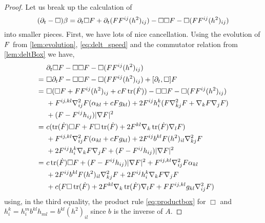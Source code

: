 \documentclass{amsart}
\begin{document}
\begin{proof}
Let us break up the calculation of
\[
(\partial_{t} - \Box)\beta =  \partial_{t}\Box F + \partial_{t} (FF^{ij} (h^2)_{ij}) - \Box\Box F - \Box(FF^{ij} (h^2)_{ij})
\]
into smaller pieces. First, we have lots of nice cancellation. Using the evolution of \(F\) from \cref{lem:evolution}, \cref{eq:delt_speed} and the commutator relation from \cref{lem:deltBox} we have,
\begin{equation}
\label{eq:deltbeta1}
\begin{split}
&\partial_{t}\Box\p - \Box\Box\p - \Box(\p\p^{ij} (h^2)_{ij})\\ =\ &\Box\partial_t\p - \Box\Box\p - \Box(\p\p^{ij} (h^2)_{ij}) + [\partial_t, \Box] \p \\
=\ &\Box(\Box \p + \p\p^{ij}(h^2)_{ij} + c \p\operatorname{tr}(\dot{\p})) - \Box\Box\p - \Box(\p\p^{ij} (h^2)_{ij})\\
\quad &+ \p^{ij,kl} \nabla^2_{ij} \p (\a_{kl} + c \p g_{kl}) + 2\p^{ij}h^{k}_{i} (\p \nabla^2_{kj} \p + \nabla_k \p \nabla_j \p)\\
\quad &+ (\p - \p^{ij}h_{ij})| \nabla\p|^{2} \\
=\ &c (\operatorname{tr}(\dot{\p}) \Box \p + \p \Box \operatorname{tr}(\dot{\p}) + 2 \p^{kl} \nabla_k \operatorname{tr}(\dot{\p}) \nabla_l \p) \\
\quad &+ \p^{ij,kl} \nabla^2_{ij} \p (\a_{kl} + c \p g_{kl}) + 2\p^{ij}b^{kl} \p (h^2)_{il} \nabla^2_{kj} \p\\
\quad  &+ 2\p^{ij}h^{k}_{i} \nabla_k \p \nabla_j \p + (\p - \p^{ij}h_{ij})| \nabla\p|^{2} \\
=\ &c \operatorname{tr}(\dot{\p}) \Box \p + (\p - \p^{ij}h_{ij})| \nabla\p|^{2}  + \p^{ij,kl} \nabla^2_{ij} \p \a_{kl} \\
\quad &+ 2\p^{ij}b^{kl} \p (h^2)_{il} \nabla^2_{kj} \p + 2\p^{ij}h^{k}_{i} \nabla_k \p \nabla_j \p \\
\quad &+ c(\p \Box \operatorname{tr}(\dot{\p}) + 2 \p^{kl} \nabla_k \operatorname{tr}(\dot{\p}) \nabla_l \p + \p \p^{ij,kl} g_{kl} \nabla^2_{ij} \p)
\end{split}
\end{equation}
using, in the third equality, the product rule \eqref{eq:productbox} for \(\Box\)  and \(h^k_i = h^m_i b^{kl}h_{ml} = b^{kl} (h^2)_{il}\) since \(b\) is the inverse of \(A\).


\end{proof}
\end{document}
